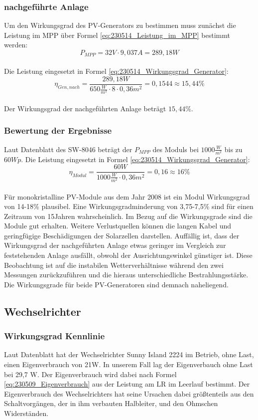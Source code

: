 \subsubsection{nachgeführte Anlage}
Um den Wirkungsgrad des PV-Generators zu bestimmen muss zunächst die Leistung im MPP über Formel \autoref{eq:230514_Leistung_im_MPP} bestimmt werden:
\\
$$P_{MPP} = 32V \cdot 9,037A = 289,18W$$ \\
Die Leistung eingesetzt in Formel \autoref{eq:230514_Wirkungsgrad_Generator}:\\
$$\eta_{Gen,nach}=\frac{289,18W}{650\frac{W}{m^2}\cdot 8\cdot 0,36 m^2}
=0,1544\approx 15,44\%$$\\
Der Wirkungsgrad der nachgeführten Anlage beträgt $15,44\%$.
\subsubsection{Bewertung der Ergebnisse}

Laut Datenblatt des SW-8046 beträgt der $P_{MPP}$ des Moduls bei $1000\frac{W}{m^2}$ bis zu $60Wp$.
Die Leistung eingesetzt in Formel \autoref{eq:230514_Wirkungsgrad_Generator}:\\
$$\eta_{Modul}=\frac{60W}{1000\frac{W}{m^2}\cdot 0,36 m^2}
=0,16\approx 16\%$$\\
Für monokristalline PV-Module aus dem Jahr 2008 ist ein Modul Wirkungsgrad von 14-18\% plausibel. Eine Wirkungsgradminderung von 3,75-7,5\% sind für einen Zeitraum von 15Jahren wahrscheinlich. Im Bezug auf die Wirkungsgrade sind die Module gut erhalten. Weitere Verlustquellen können die langen Kabel und geringfügige Beschädigungen der Solarzellen darstellen. Auffällig ist, dass der Wirkungsgrad der nachgeführten Anlage etwas geringer im Vergleich zur feststehenden Anlage ausfällt, obwohl der Ausrichtungswinkel günstiger ist. Diese Beobachtung ist auf die instabilen Wetterverhältnisse während den zwei Messungen zurückzuführen und die hieraus unterschiedliche Bestrahlungsstärke.
Die Wirkungsgrade für beide PV-Generatoren sind demnach naheliegend.


\subsection{Wechselrichter}
\subsubsection{Wirkungsgrad Kennlinie}
Laut Datenblatt hat der Wechselrichter Sunny Island 2224 im Betrieb, ohne Last, einen Eigenverbrauch von 21W. 
In unserem Fall lag der Eigenverbauch ohne Last bei 29,7 W. 
Der Eigenverbrauch wird dabei nach Formel \autoref{eq:230509_Eigenverbrauch} aus der Leistung am LR im Leerlauf bestimmt. 
Der Eigenverbrauch des Wechselrichters hat seine Ursachen dabei größtenteils aus den Schaltvorgängen, der in ihm verbauten Halbleiter, und den Ohmschen Widerständen.

